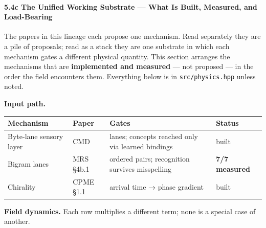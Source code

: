 \documentclass[
  11pt,
  a4paper,
]{article}
\begin{document}
\paragraph{5.4c The Unified Working Substrate --- What Is Built,
Measured, and
Load-Bearing}\label{c-the-unified-working-substrate-what-is-built-measured-and-load-bearing}

The papers in this lineage each propose one mechanism. Read separately
they are a pile of proposals; read as a stack they are one substrate in
which each mechanism gates a different physical quantity. This section
arranges the mechanisms that are \textbf{implemented and measured} ---
not proposed --- in the order the field encounters them. Everything
below is in \texttt{src/physics.hpp} unless noted.

\textbf{Input path.}

\begin{longtable}[]{@{}
  >{\raggedright\arraybackslash}p{}
  >{\raggedright\arraybackslash}p{}
  >{\raggedright\arraybackslash}p{}
  >{\raggedright\arraybackslash}p{}@{}}
\toprule\noalign{}
\begin{minipage}[b]{\linewidth}\raggedright
Mechanism
\end{minipage} & \begin{minipage}[b]{\linewidth}\raggedright
Paper
\end{minipage} & \begin{minipage}[b]{\linewidth}\raggedright
Gates
\end{minipage} & \begin{minipage}[b]{\linewidth}\raggedright
Status
\end{minipage} \\
\midrule\noalign{}
\endhead
\bottomrule\noalign{}
\endlastfoot
Byte-lane sensory layer & CMD & 256 lanes; concepts reached only via
learned bindings & built \\
Bigram lanes & MRS §4b.1 & ordered pairs; recognition survives
misspelling & \textbf{7/7 measured} \\
Chirality & CPME §1.1 & arrival time → phase gradient & built \\
\end{longtable}

\textbf{Field dynamics.} Each row multiplies a different term; none is a
special case of another.
\end{document}

